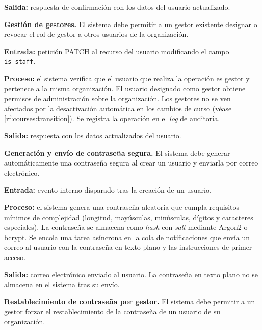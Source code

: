 \begin{functional}
    \textbf{Salida:} respuesta de confirmación con los datos del usuario actualizado.

    \item \textbf{Gestión de gestores.} \label{rf:users:staff}
    El sistema debe permitir a un gestor existente designar o revocar el rol de gestor a
    otros usuarios de la organización.

    \textbf{Entrada:} petición PATCH al recurso del usuario modificando el campo
    \texttt{is\_staff}.

    \textbf{Proceso:} el sistema verifica que el usuario que realiza la operación es gestor
    y pertenece a la misma organización. El usuario designado como gestor obtiene permisos
    de administración sobre la organización. Los gestores no se ven afectados por la
    desactivación automática en los cambios de curso (véase \cref{rf:courses:transition}).
    Se registra la operación en el \textit{log} de auditoría.

    \textbf{Salida:} respuesta con los datos actualizados del usuario.

    \item \textbf{Generación y envío de contraseña segura.} \label{rf:users:password_gen}
    El sistema debe generar automáticamente una contraseña segura al crear un usuario y
    enviarla por correo electrónico.

    \textbf{Entrada:} evento interno disparado tras la creación de un usuario.

    \textbf{Proceso:} el sistema genera una contraseña aleatoria que cumpla requisitos
    mínimos de complejidad (longitud, mayúsculas, minúsculas, dígitos y caracteres
    especiales). La contraseña se almacena como \textit{hash} con \textit{salt} mediante
    Argon2 o bcrypt. Se encola una tarea asíncrona en la cola de notificaciones que envía
    un correo al usuario con la contraseña en texto plano y las instrucciones de primer
    acceso.

    \textbf{Salida:} correo electrónico enviado al usuario. La contraseña en texto plano no
    se almacena en el sistema tras su envío.

    \item \textbf{Restablecimiento de contraseña por gestor.} \label{rf:users:password_reset}
    El sistema debe permitir a un gestor forzar el restablecimiento de la contraseña de un
    usuario de su organización.


\end{functional}
